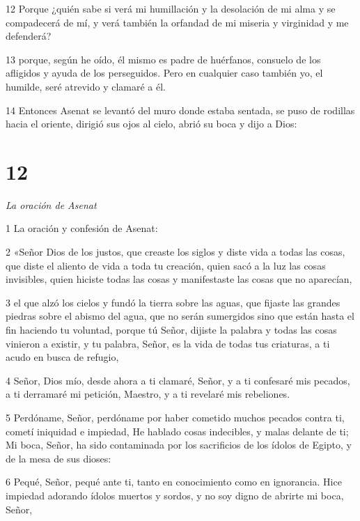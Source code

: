 \par 12 Porque ¿quién sabe si verá mi humillación y la desolación de mi alma y se compadecerá de mí, y verá también la orfandad de mi miseria y virginidad y me defenderá?

\par 13 porque, según he oído, él mismo es padre de huérfanos, consuelo de los afligidos y ayuda de los perseguidos. Pero en cualquier caso también yo, el humilde, seré atrevido y clamaré a él.

\par 14 Entonces Asenat se levantó del muro donde estaba sentada, se puso de rodillas hacia el oriente, dirigió sus ojos al cielo, abrió su boca y dijo a Dios:

\chapter{12}

\par \textit{La oración de Asenat}

\par 1 La oración y confesión de Asenat:

\par 2 «Señor Dios de los justos, que creaste los siglos y diste vida a todas las cosas,
que diste el aliento de vida a toda tu creación,
quien sacó a la luz las cosas invisibles,
quien hiciste todas las cosas y manifestaste las cosas que no aparecían,

\par 3 el que alzó los cielos y fundó la tierra sobre las aguas,
que fijaste las grandes piedras sobre el abismo del agua,
que no serán sumergidos sino que están hasta el fin haciendo tu voluntad,
porque tú Señor, dijiste la palabra y todas las cosas vinieron a existir, y tu palabra, Señor, es la vida de todas tus criaturas, a ti acudo en busca de refugio,

\par 4 Señor, Dios mío, desde ahora a ti clamaré, Señor,
y a ti confesaré mis pecados, a ti derramaré mi petición, Maestro,
y a ti revelaré mis rebeliones.

\par 5 Perdóname, Señor, perdóname por haber cometido muchos pecados contra ti,
cometí iniquidad e impiedad,
He hablado cosas indecibles, y malas delante de ti;
Mi boca, Señor, ha sido contaminada por los sacrificios de los ídolos de Egipto,
y de la mesa de sus dioses:

\par 6 Pequé, Señor, pequé ante ti, tanto en conocimiento como en ignorancia.
Hice impiedad adorando ídolos muertos y sordos,
y no soy digno de abrirte mi boca, Señor,


